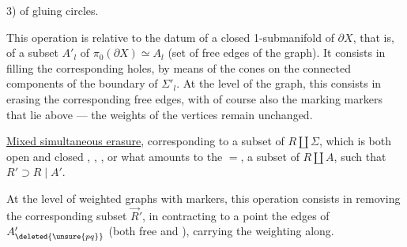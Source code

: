 3)   of gluing circles.

This operation is relative to the datum of a closed 1-submanifold of $\partial X$, that is, of a subset $A'_l$ of $\pi_0(\partial X)\simeq A_l$ (set of free edges of the graph).
It consists in filling the corresponding holes, by means of the cones on the connected components of the boundary of $\Sigma'_l$.
At the level of the graph, this consists in erasing the corresponding free edges, with of course also the marking markers that lie above ---  the weights of the vertices remain unchanged.

\uline{Mixed simultaneous erasure},  corresponding to a subset
   of $R\amalg\Sigma$,
which is both open and closed 
,
,
,
or what amounts to the $=$, a subset  of $R\amalg A$, such that $R'\supset R\mid A'$.

At the level of weighted graphs with markers, this operation consists in removing   the corresponding subset $\vec R'$, in contracting to a point the edges of $A'_{\deleted{\unsure{pq}}}$ (both free and ), carrying the weighting along.
